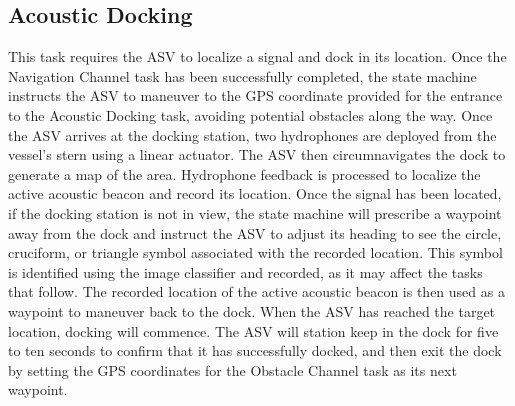 \documentclass[letterpaper, 12 pt, conference]{ieeeconf}
\begin{document}
\subsection{Acoustic Docking}
This task requires the ASV to localize a signal and dock in its location. Once the Navigation Channel task has been successfully completed, the state machine instructs the ASV to maneuver to the GPS coordinate provided for the entrance to the Acoustic Docking task, avoiding potential obstacles along the way. Once the ASV arrives at the docking station, two hydrophones are deployed from the vessel's stern using a linear actuator. The ASV then circumnavigates the dock to generate a map of the area.  Hydrophone feedback is processed to localize the active acoustic beacon and record its location. Once the signal has been located, if the docking station is not in view, the state machine will prescribe a waypoint away from the dock and instruct the ASV to adjust its heading to see the circle, cruciform, or triangle symbol associated with the recorded location. This symbol is identified using the image classifier and recorded, as it may affect the tasks that follow. The recorded location of the active acoustic beacon is then used as a waypoint to maneuver back to the dock. When the ASV has reached the target location, docking will commence. The ASV will station keep in the dock for five to ten seconds to confirm that it has successfully docked, and then exit the dock by setting the GPS coordinates for the Obstacle Channel task as its next waypoint.
\end{document}
